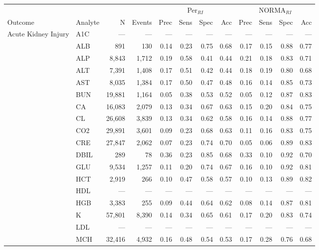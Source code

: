\begin{table}[ht]
\centering
\footnotesize
\begin{tabular}{llrrrrrrrrrr}
\toprule
 & & &  & \multicolumn{4}{c}{Per$_{RI}$} & \multicolumn{4}{c}{NORMA$_{RI}$} \\
\cmidrule(lr){5-8} \cmidrule(lr){9-12}
Outcome & Analyte & N & Events & Prec & Sens & Spec & Acc & Prec & Sens & Spec & Acc \\
\midrule
Acute Kidney Injury & A1C & --- & --- & --- & --- & --- & --- & --- & --- & --- & --- \\
 & ALB & 891 & 130 & 0.14 & 0.23 & 0.75 & 0.68 & 0.17 & 0.15 & 0.88 & 0.77 \\
 & ALP & 8,843 & 1,712 & 0.19 & 0.58 & 0.41 & 0.44 & 0.21 & 0.18 & 0.83 & 0.71 \\
 & ALT & 7,391 & 1,408 & 0.17 & 0.51 & 0.42 & 0.44 & 0.18 & 0.19 & 0.80 & 0.68 \\
 & AST & 8,035 & 1,384 & 0.17 & 0.50 & 0.47 & 0.48 & 0.16 & 0.14 & 0.85 & 0.73 \\
 & BUN & 19,881 & 1,164 & 0.05 & 0.38 & 0.53 & 0.52 & 0.05 & 0.12 & 0.87 & 0.83 \\
 & CA & 16,083 & 2,079 & 0.13 & 0.34 & 0.67 & 0.63 & 0.15 & 0.20 & 0.84 & 0.75 \\
 & CL & 26,608 & 3,839 & 0.13 & 0.34 & 0.62 & 0.58 & 0.16 & 0.14 & 0.88 & 0.77 \\
 & CO2 & 29,891 & 3,601 & 0.09 & 0.23 & 0.68 & 0.63 & 0.11 & 0.16 & 0.83 & 0.75 \\
 & CRE & 27,847 & 2,062 & 0.07 & 0.23 & 0.74 & 0.70 & 0.05 & 0.06 & 0.89 & 0.83 \\
 & DBIL & 289 & 78 & 0.36 & 0.23 & 0.85 & 0.68 & 0.33 & 0.10 & 0.92 & 0.70 \\
 & GLU & 9,534 & 1,257 & 0.11 & 0.20 & 0.74 & 0.67 & 0.16 & 0.10 & 0.92 & 0.81 \\
 & HCT & 2,919 & 266 & 0.10 & 0.47 & 0.58 & 0.57 & 0.10 & 0.13 & 0.89 & 0.82 \\
 & HDL & --- & --- & --- & --- & --- & --- & --- & --- & --- & --- \\
 & HGB & 3,383 & 255 & 0.09 & 0.44 & 0.64 & 0.62 & 0.08 & 0.14 & 0.87 & 0.81 \\
 & K & 57,801 & 8,390 & 0.14 & 0.34 & 0.65 & 0.61 & 0.17 & 0.20 & 0.83 & 0.74 \\
 & LDL & --- & --- & --- & --- & --- & --- & --- & --- & --- & --- \\
 & MCH & 32,416 & 4,932 & 0.16 & 0.48 & 0.54 & 0.53 & 0.17 & 0.28 & 0.76 & 0.68 \\

\end{tabular}
\end{table}
